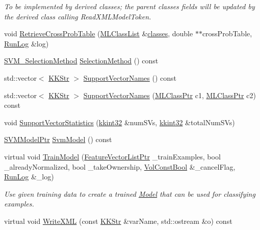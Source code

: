 \begin{DoxyCompactItemize}
\begin{DoxyCompactList}\small\item\em To be implemented by derived classes; the parent classes fields will be updated by the derived class calling Read\+X\+M\+L\+Model\+Token. \end{DoxyCompactList}\item 
void \hyperlink{class_k_k_m_l_l_1_1_model_old_s_v_m_a3f0c5c06bb287c4bd1734c4fa4dc7520}{Retrieve\+Cross\+Prob\+Table} (\hyperlink{class_k_k_m_l_l_1_1_m_l_class_list}{M\+L\+Class\+List} \&\hyperlink{class_k_k_m_l_l_1_1_model_a764e7680f07814c3c5313dc4e4de60a1}{classes}, double $\ast$$\ast$cross\+Prob\+Table, \hyperlink{class_k_k_b_1_1_run_log}{Run\+Log} \&log)
\item 
\hyperlink{namespace_k_k_m_l_l_afab7be632987641e5805e770be7f6bf8}{S\+V\+M\+\_\+\+Selection\+Method} \hyperlink{class_k_k_m_l_l_1_1_model_old_s_v_m_ac76da2e7d5179c7b29ef05194b5337e5}{Selection\+Method} () const 
\item 
std\+::vector$<$ \hyperlink{class_k_k_b_1_1_k_k_str}{K\+K\+Str} $>$ \hyperlink{class_k_k_m_l_l_1_1_model_old_s_v_m_a0faf1d2b9c960d1778ab66f6a8baacba}{Support\+Vector\+Names} () const 
\item 
std\+::vector$<$ \hyperlink{class_k_k_b_1_1_k_k_str}{K\+K\+Str} $>$ \hyperlink{class_k_k_m_l_l_1_1_model_old_s_v_m_add3a0fa9773d6f435ae2822b28d55113}{Support\+Vector\+Names} (\hyperlink{namespace_k_k_m_l_l_ac272393853d59e72e8456f14cd6d8c23}{M\+L\+Class\+Ptr} c1, \hyperlink{namespace_k_k_m_l_l_ac272393853d59e72e8456f14cd6d8c23}{M\+L\+Class\+Ptr} c2) const 
\item 
void \hyperlink{class_k_k_m_l_l_1_1_model_old_s_v_m_a831aa8e22b89b087a9df7bf6488264c2}{Support\+Vector\+Statistics} (\hyperlink{namespace_k_k_b_a8fa4952cc84fda1de4bec1fbdd8d5b1b}{kkint32} \&num\+S\+Vs, \hyperlink{namespace_k_k_b_a8fa4952cc84fda1de4bec1fbdd8d5b1b}{kkint32} \&total\+Num\+S\+Vs)
\item 
\hyperlink{namespace_k_k_m_l_l_ab9364c3a3533933d050a3e9a3490e13a}{S\+V\+M\+Model\+Ptr} \hyperlink{class_k_k_m_l_l_1_1_model_old_s_v_m_a8919ff70a99646266de13a130db1672c}{Svm\+Model} () const 
\item 
virtual void \hyperlink{class_k_k_m_l_l_1_1_model_old_s_v_m_a38047608aa2f3ce8321edf77ea24207b}{Train\+Model} (\hyperlink{namespace_k_k_m_l_l_acf2ba92a3cf03e2b19674b24ff488ef6}{Feature\+Vector\+List\+Ptr} \+\_\+train\+Examples, bool \+\_\+already\+Normalized, bool \+\_\+take\+Ownership, \hyperlink{namespace_k_k_b_a7d390f568e2831fb76b86b56c87bf92f}{Vol\+Const\+Bool} \&\+\_\+cancel\+Flag, \hyperlink{class_k_k_b_1_1_run_log}{Run\+Log} \&\+\_\+log)
\begin{DoxyCompactList}\small\item\em Use given training data to create a trained \hyperlink{class_k_k_m_l_l_1_1_model}{Model} that can be used for classifying examples. \end{DoxyCompactList}\item 
virtual void \hyperlink{class_k_k_m_l_l_1_1_model_old_s_v_m_a0d65427d615b71dcf55cd463ec9422b0}{Write\+X\+ML} (const \hyperlink{class_k_k_b_1_1_k_k_str}{K\+K\+Str} \&var\+Name, std\+::ostream \&o) const 
\end{DoxyCompactItemize}
